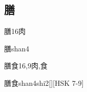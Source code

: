 \subsection*{膳}

\begin{Entry}{膳}{16}{⾁}
  \begin{Phonetics}{膳}{shan4}
  \end{Phonetics}
\end{Entry}

\begin{Entry}{膳食}{16,9}{⾁,⾷}
  \begin{Phonetics}{膳食}{shan4shi2}[][HSK 7-9]
  \end{Phonetics}
\end{Entry}


